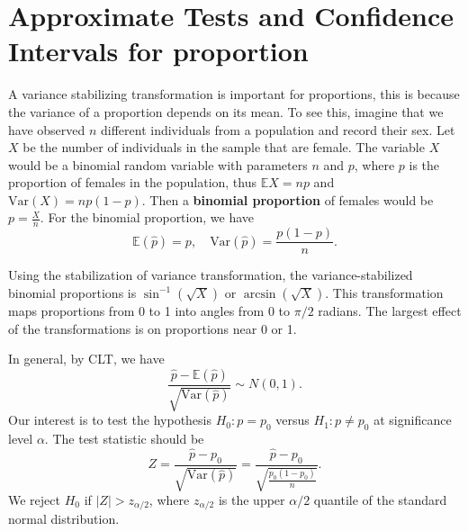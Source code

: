\section{Approximate Tests and Confidence Intervals for proportion}

A variance stabilizing transformation is important for proportions,  
this is because the variance of a proportion depends on its mean. To 
see this, imagine that we have observed $n$ different individuals 
from a population and record their sex. Let $X$ be the number of 
individuals in the sample that are female. The 
variable $X$ would be a binomial random variable with 
parameters $n$ and $p$, where $p$ is the proportion of females in the population,
thus $\mathbb{E} X = np$ and $\text{Var}(X) = np(1-p)$. Then 
a \textbf{binomial proportion} of females would be $p = \frac{X}{n}$.
For the binomial proportion, we have
\begin{equation}
    \mathbb{E}(\widehat{p}) = p, \quad \text{Var}(\widehat{p}) = \frac{p(1-p)}{n}.
\end{equation}

Using the stabilization of variance transformation, the variance-stabilized binomial 
proportions is $\sin^{-1}(\sqrt{X})$ or $\arcsin(\sqrt{X})$. This transformation maps 
proportions from 0 to 1 into angles from 0 to $\pi/2$ radians. The largest 
effect of the transformations is on proportions near 0 or 1.

In general, by CLT, we have 
\begin{equation}
    \frac{\widehat{p} - \mathbb{E}(\widehat{p})}{\sqrt{\text{Var}(\widehat{p})}} \sim N(0,1).
\end{equation}
Our interest is to test the hypothesis $H_0 : p = p_0$ versus $H_1 : p \neq p_0$ at significance level $\alpha$.
The test statistic should be 
\begin{equation}
    Z = \frac{\widehat{p} - p_0}{\sqrt{\text{Var}(\widehat{p})}} = \frac{\widehat{p} - p_0}{\sqrt{\frac{p_0(1-p_0)}{n}}}.
\end{equation}
We reject $H_0$ if $|Z| > z_{\alpha/2}$, where $z_{\alpha/2}$ is the upper $\alpha/2$ quantile of the standard normal distribution.

